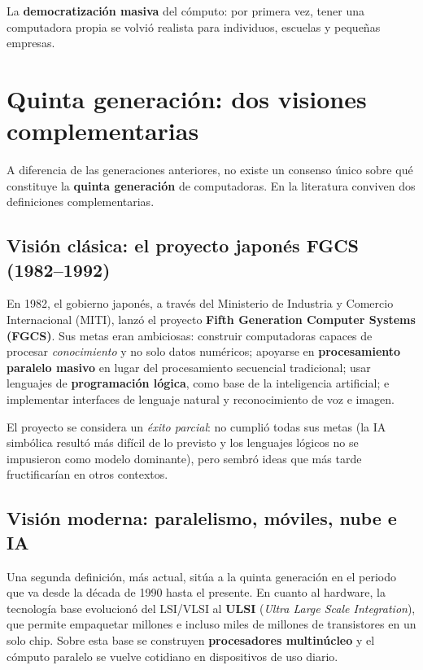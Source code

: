 \documentclass[10pt,letterpaper,twocolumn]{article}
\begin{document}
La \textbf{democratización masiva} del cómputo: por primera vez, tener
una computadora propia se volvió realista para individuos, escuelas y
pequeñas empresas.

\section{Quinta generación: dos visiones complementarias}

A diferencia de las generaciones anteriores, no existe un consenso único
sobre qué constituye la \textbf{quinta generación} de computadoras. En
la literatura conviven dos definiciones complementarias.

\subsection{Visión clásica: el proyecto japonés FGCS (1982--1992)}

En 1982, el gobierno japonés, a través del Ministerio de Industria y
Comercio Internacional (MITI), lanzó el proyecto \textbf{Fifth
Generation Computer Systems (FGCS)}. Sus metas eran ambiciosas:
construir computadoras capaces de procesar \emph{conocimiento} y no
solo datos numéricos; apoyarse en \textbf{procesamiento paralelo
masivo} en lugar del procesamiento secuencial tradicional; usar
lenguajes de \textbf{programación lógica},
como base de la inteligencia artificial; e implementar interfaces de
lenguaje natural y reconocimiento de voz e imagen.

El proyecto se considera un \emph{éxito parcial}: no cumplió todas sus
metas (la IA simbólica resultó más difícil de lo previsto y los
lenguajes lógicos no se impusieron como modelo dominante), pero sembró
ideas que más tarde fructificarían en otros contextos.

\subsection{Visión moderna: paralelismo, móviles, nube e IA}

Una segunda definición, más actual, sitúa a la quinta generación en el
periodo que va desde la década de 1990 hasta el presente. En cuanto al
hardware, la tecnología base evolucionó del LSI/VLSI al
\textbf{ULSI} (\emph{Ultra Large Scale Integration}), que permite
empaquetar millones e incluso miles de millones de transistores en un
solo chip. Sobre esta base se construyen \textbf{procesadores
multinúcleo} y el cómputo paralelo se vuelve cotidiano en dispositivos
de uso diario.
\end{document}
